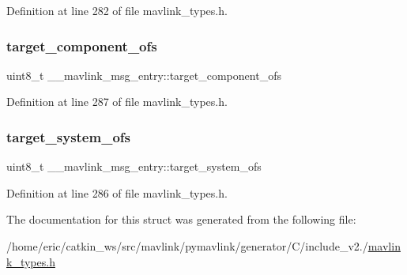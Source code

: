 Definition at line 282 of file mavlink\+\_\+types.\+h.

\mbox{\label{struct____mavlink__msg__entry_a08d68ae337d99e053f02cb248a8d41b8}} 
\subsubsection{\texorpdfstring{target\_component\_ofs}{target\_component\_ofs}}
{\footnotesize\ttfamily uint8\+\_\+t \+\_\+\+\_\+mavlink\+\_\+msg\+\_\+entry\+::target\+\_\+component\+\_\+ofs}



Definition at line 287 of file mavlink\+\_\+types.\+h.

\mbox{\label{struct____mavlink__msg__entry_a4c94154ed0764d8084d67270b1142dfa}} 
\subsubsection{\texorpdfstring{target\_system\_ofs}{target\_system\_ofs}}
{\footnotesize\ttfamily uint8\+\_\+t \+\_\+\+\_\+mavlink\+\_\+msg\+\_\+entry\+::target\+\_\+system\+\_\+ofs}



Definition at line 286 of file mavlink\+\_\+types.\+h.



The documentation for this struct was generated from the following file\+:\begin{DoxyCompactItemize}
\item 
/home/eric/catkin\+\_\+ws/src/mavlink/pymavlink/generator/\+C/include\+\_\+v2./\mbox{\hyperlink{include__v2_80_2mavlink__types_8h}{mavlink\+\_\+types.\+h}}\end{DoxyCompactItemize}
